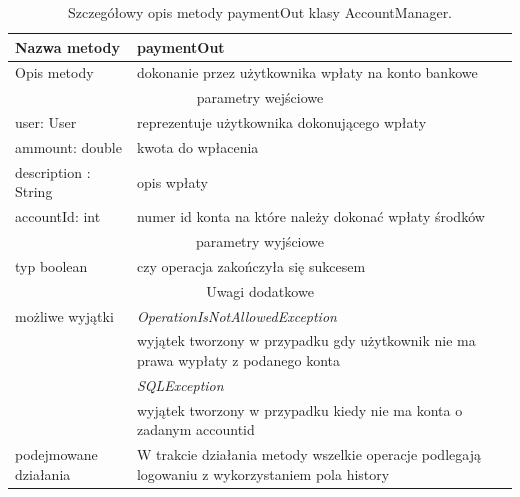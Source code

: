 \documentclass[12pt,a4paper]{article}
\begin{document}
\begin{table}[!h]
\begin{center}
\begin{tabularx}{\textwidth}{|l|X|}
  \hline
  Nazwa metody  & paymentOut  \\\hline
  Opis metody   & dokonanie przez użytkownika wpłaty na konto bankowe\\\hline\hline
  \multicolumn{2}{|c|}{parametry wejściowe} \\\hline
  user: User            &  reprezentuje użytkownika dokonującego wpłaty  \\\hline
  ammount: double       &  kwota do wpłacenia  \\\hline
  description : String  & opis wpłaty \\\hline
  accountId: int        & numer id konta na które należy dokonać wpłaty środków \\\hline\hline
  \multicolumn{2}{|c|}{parametry wyjściowe}   \\\hline
  typ boolean &  czy operacja zakończyła się sukcesem\\\hline\hline
  \multicolumn{2}{|c|}{Uwagi dodatkowe}\\\hline
  możliwe wyjątki   & \textit{OperationIsNotAllowedException} \\
                    & wyjątek tworzony w przypadku gdy użytkownik nie ma prawa wypłaty z podanego konta\\
                    & \textit{SQLException}\\
                    & wyjątek tworzony w przypadku kiedy nie ma  konta o zadanym accountid\\\hline
  podejmowane działania & W trakcie działania metody wszelkie operacje  podlegają logowaniu z wykorzystaniem pola history\\
  \hline
\end{tabularx}
\caption{Szczegółowy opis metody paymentOut klasy AccountManager.}\label{Opis_Klasy}
\end{center}
\end{table}
\end{document}
